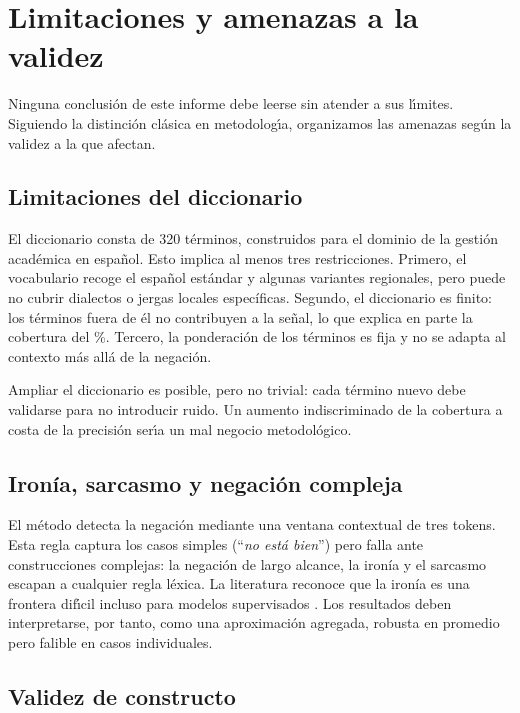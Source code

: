 \section{Limitaciones y amenazas a la validez}
\label{sec:limitaciones}

Ninguna conclusi\'on de este informe debe leerse sin atender a sus l\'\i{}mites. Siguiendo
la distinci\'on cl\'asica en metodolog\'\i{}a, organizamos las amenazas seg\'un la
validez a la que afectan.

\subsection{Limitaciones del diccionario}

El diccionario consta de 320 términos, construidos para el dominio de la gesti\'on
acad\'emica en espa\~nol. Esto implica al menos tres restricciones. Primero, el
vocabulario recoge el espa\~nol est\'andar y algunas variantes regionales, pero puede no
cubrir dialectos o jergas locales espec\'ificas. Segundo, el diccionario es finito: los
términos fuera de \'el no contribuyen a la se\~nal, lo que explica en parte la cobertura
del \pctCobertura{}\%. Tercero, la ponderaci\'on de los términos es fija y no se adapta al
contexto m\'as all\'a de la negaci\'on.

Ampliar el diccionario es posible, pero no trivial: cada término nuevo debe validarse
para no introducir ruido. Un aumento indiscriminado de la cobertura a costa de la
precisi\'on ser\'\i{}a un mal negocio metodol\'ogico.

\subsection{Ironía, sarcasmo y negaci\'on compleja}

El m\'etodo detecta la negaci\'on mediante una ventana contextual de tres tokens. Esta
regla captura los casos simples (``\emph{no est\'a bien}'') pero falla ante
construcciones complejas: la negaci\'on de largo alcance, la ironía y el sarcasmo
escapan a cualquier regla l\'exica. La literatura reconoce que la ironía es una frontera
dif\'\i{}cil incluso para modelos supervisados \citep{liu2012sentiment}. Los resultados
deben interpretarse, por tanto, como una aproximaci\'on agregada, robusta en promedio pero
falible en casos individuales.

\subsection{Validez de constructo}

